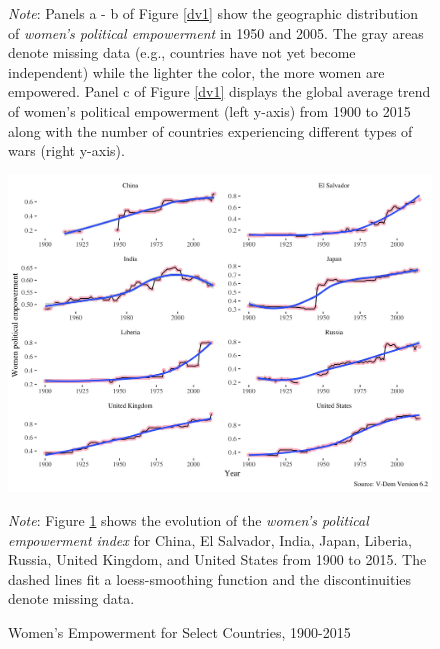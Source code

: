 \documentclass [12pt] {article}
\renewcommand{\footnotesize}{\scriptsize} %
\begin{document}
\begin{figure}[h]
  \begin{flushleft}  
        {\footnotesize {\it Note}: Panels a - b of Figure \ref{dv1} show the geographic distribution of {\it women's political empowerment} in 1950 and 2005. The gray areas denote missing data (e.g., countries have not yet become independent) while the lighter the color, the more women are empowered. Panel c of  Figure \ref{dv1} displays the global average trend of women's political empowerment (left y-axis)  from 1900 to 2015 along with the number of countries experiencing different types of wars (right y-axis).}
       \end{flushleft} 
\end{figure}


\begin{figure}[h]
   \centering
    \caption{Women's Empowerment for Select Countries, 1900-2015 }
    \label{dv2}
  \includegraphics[scale=.2]{Fig2.jpg}
  \begin{flushleft}  
        {\footnotesize {\it Note}: Figure \ref{dv2} shows the evolution of the {\it women's political empowerment index} for China, El Salvador, India, Japan, Liberia,  Russia, United Kingdom, and United States from 1900 to 2015. The dashed lines fit a loess-smoothing function and the discontinuities denote missing data.}
       \end{flushleft} 
\end{figure}
\end{document}
